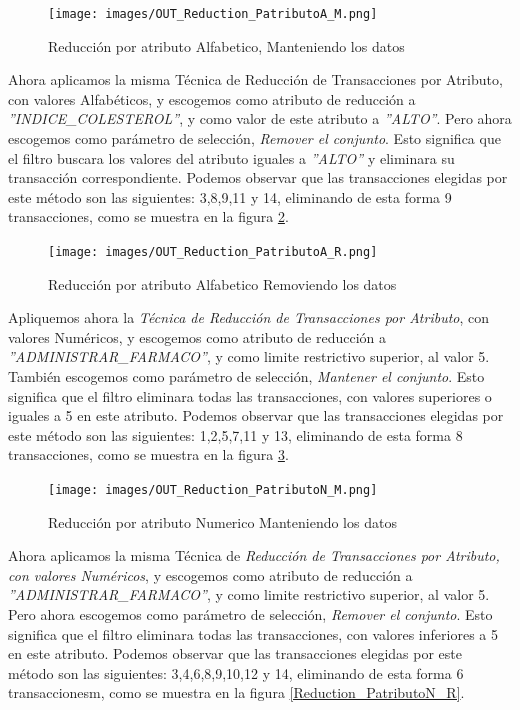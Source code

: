 \begin{figure}[h]
\centering
\texttt{[image: images/OUT\_Reduction\_PatributoA\_M.png]}
\caption{Reducci\'on por atributo Alfabetico, Manteniendo los datos}
\label{Reduction_PatributoA_M}
\end{figure}

Ahora aplicamos la misma T\'ecnica de Reducci\'on de Transacciones por Atributo, con valores Alfab\'eticos, y escogemos como atributo de reducci\'on a \textit{''INDICE\_COLESTEROL''}, y como valor de este atributo a \textit{''ALTO''}. Pero ahora escogemos como par\'ametro de selecci\'on, \textit{Remover el conjunto}. Esto significa que el filtro buscara los valores del atributo iguales a \textit{''ALTO''} y eliminara su transacci\'on correspondiente.
Podemos observar que las transacciones elegidas por este m\'etodo son las siguientes: 3,8,9,11 y 14, eliminando de esta forma 9 transacciones, como se muestra en la figura \ref{Reduction_PatributoA_R}.\\
   
\begin{figure}[h]
\centering
\texttt{[image: images/OUT\_Reduction\_PatributoA\_R.png]}
\caption{Reducci\'on por atributo Alfabetico Removiendo los datos}
\label{Reduction_PatributoA_R}
\end{figure}

Apliquemos ahora la \textit{T\'ecnica de  Reducci\'on de Transacciones por Atributo}, con valores  Num\'ericos, y escogemos como atributo de reducci\'on a \textit{''ADMINISTRAR\_FARMACO''}, y  como limite restrictivo superior, al valor 5. \\
Tambi\'en escogemos como par\'ametro de selecci\'on, \textit{Mantener el conjunto}. Esto significa que el filtro eliminara todas las transacciones, con valores superiores o iguales a 5 en este atributo.
Podemos observar que las transacciones elegidas por este m\'etodo son las siguientes: 1,2,5,7,11 y 13, eliminando de esta forma 8 transacciones, como se muestra en la figura \ref{Reduction_PatributoN_M}.\\
   
\begin{figure}[h]
\centering
\texttt{[image: images/OUT\_Reduction\_PatributoN\_M.png]}
\caption{Reducci\'on por atributo Numerico Manteniendo los datos}
\label{Reduction_PatributoN_M}
\end{figure}

Ahora aplicamos la misma T\'ecnica de \textit{Reducci\'on de Transacciones por Atributo, con valores  Num\'ericos}, y escogemos como atributo de reducci\'on a \textit{''ADMINISTRAR\_FARMACO''}, y  como limite restrictivo superior, al valor 5. Pero ahora escogemos como par\'ametro de selecci\'on, \textit{Remover el conjunto}. Esto significa que el filtro eliminara todas las transacciones, con valores inferiores a 5 en este atributo.
Podemos observar que las transacciones elegidas por este m\'etodo son las siguientes: 3,4,6,8,9,10,12 y 14, eliminando de esta forma 6 transaccionesm, como se muestra en la figura \ref{Reduction_PatributoN_R}.\\
   
